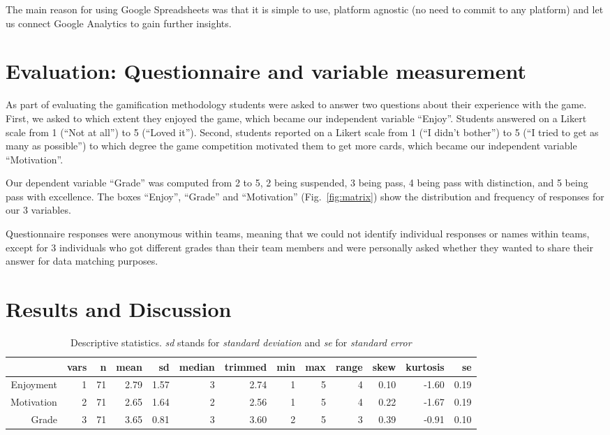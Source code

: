 \documentclass[sigconf]{acmart}
\begin{document}
The main reason for using Google Spreadsheets was that it is simple to
use, platform agnostic (no need to commit to any platform) and let us
connect Google Analytics to gain further insights.

\hypertarget{evaluation-questionnaire-and-variable-measurement}{%
\section{Evaluation: Questionnaire and variable
measurement}\label{evaluation-questionnaire-and-variable-measurement}}

As part of evaluating the gamification methodology students were asked
to answer two questions about their experience with the game. First, we
asked to which extent they enjoyed the game, which became our
independent variable ``Enjoy''. Students answered on a Likert scale from
1 (``Not at all'') to 5 (``Loved it''). Second, students reported on a
Likert scale from 1 (``I didn't bother'') to 5 (``I tried to get as many
as possible'') to which degree the game competition motivated them to
get more cards, which became our independent variable ``Motivation''.

Our dependent variable ``Grade'' was computed from 2 to 5, 2 being
suspended, 3 being pass, 4 being pass with distinction, and 5 being pass
with excellence. The boxes ``Enjoy'', ``Grade'' and ``Motivation''
(Fig.~\ref{fig:matrix}) show the distribution and frequency of responses
for our 3 variables.

Questionnaire responses were anonymous within teams, meaning that we
could not identify individual responses or names within teams, except
for 3 individuals who got different grades than their team members and
were personally asked whether they wanted to share their answer for data
matching purposes.

\hypertarget{results-and-discussion}{%
\section{Results and Discussion}\label{results-and-discussion}}

\begin{table*}[t]
\centering
\begin{tabular}{|r|r|r|r|r|r|r|r|r|r|r|r|r|}
\hline
 & vars & n & mean & sd & median & trimmed & min & max & range & skew & kurtosis & se \\
\hline
Enjoyment & 1 & 71 & 2.79 & 1.57 & 3 & 2.74 & 1 & 5 & 4 & 0.10 & -1.60 & 0.19 \\
\hline
Motivation & 2 & 71 & 2.65 & 1.64 & 2 & 2.56 & 1 & 5 & 4 & 0.22 & -1.67 & 0.19 \\
\hline
Grade & 3 & 71 & 3.65 & 0.81 & 3 & 3.60 & 2 & 5 & 3 & 0.39 & -0.91 & 0.10 \\
\hline
\end{tabular}
\caption{\label{tbl:statistics}Descriptive statistics. \emph{sd} stands for \emph{standard deviation}
and \emph{se} for \emph{standard error}}
\end{table*}
\end{document}
